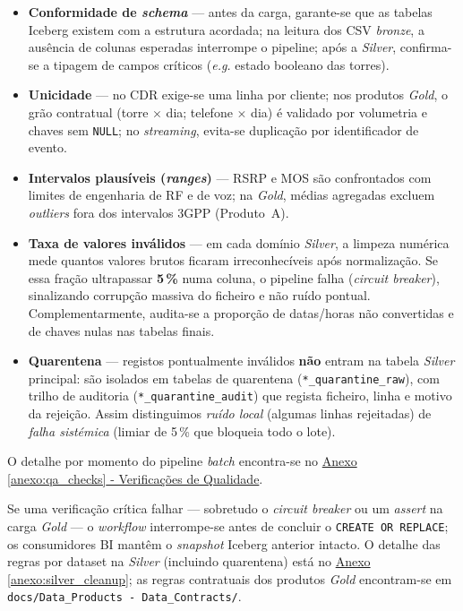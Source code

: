 \documentclass[runningheads]{llncs}
\begin{document}
\begin{itemize}
    \item \textbf{Conformidade de \textit{schema}} --- antes da carga, garante-se que as tabelas Iceberg existem com a estrutura acordada; na leitura dos CSV \textit{bronze}, a ausência de colunas esperadas interrompe o pipeline; após a \textit{Silver}, confirma-se a tipagem de campos críticos (\textit{e.g.} estado booleano das torres).
    \item \textbf{Unicidade} --- no CDR exige-se uma linha por cliente; nos produtos \textit{Gold}, o grão contratual (torre $\times$ dia; telefone $\times$ dia) é validado por volumetria e chaves sem \texttt{NULL}; no \textit{streaming}, evita-se duplicação por identificador de evento.
    \item \textbf{Intervalos plausíveis (\textit{ranges})} --- RSRP e MOS são confrontados com limites de engenharia de RF e de voz; na \textit{Gold}, médias agregadas excluem \textit{outliers} fora dos intervalos 3GPP (Produto~A).
    \item \textbf{Taxa de valores inválidos} --- em cada domínio \textit{Silver}, a limpeza numérica mede quantos valores brutos ficaram irreconhecíveis após normalização. Se essa fração ultrapassar \textbf{5\,\%} numa coluna, o pipeline falha (\textit{circuit breaker}), sinalizando corrupção massiva do ficheiro e não ruído pontual. Complementarmente, audita-se a proporção de datas/horas não convertidas e de chaves nulas nas tabelas finais.
    \item \textbf{Quarentena} --- registos pontualmente inválidos \textbf{não} entram na tabela \textit{Silver} principal: são isolados em tabelas de quarentena (\texttt{*\_quarantine\_raw}), com trilho de auditoria (\texttt{*\_quarantine\_audit}) que regista ficheiro, linha e motivo da rejeição. Assim distinguimos \emph{ruído local} (algumas linhas rejeitadas) de \emph{falha sistémica} (limiar de 5\,\% que bloqueia todo o lote).
\end{itemize}

O detalhe por momento do pipeline \textit{batch} encontra-se no \hyperref[anexo:qa_checks]{Anexo \ref*{anexo:qa_checks} - Verificações de Qualidade}.

Se uma verificação crítica falhar --- sobretudo o \textit{circuit breaker} ou um \textit{assert} na carga \textit{Gold} --- o \textit{workflow} interrompe-se antes de concluir o \texttt{CREATE OR REPLACE}; os consumidores BI mantêm o \textit{snapshot} Iceberg anterior intacto. O detalhe das regras por dataset na \textit{Silver} (incluindo quarentena) está no \hyperref[anexo:silver_cleanup]{Anexo \ref*{anexo:silver_cleanup}}; as regras contratuais dos produtos \textit{Gold} encontram-se em \texttt{docs/Data\_Products - Data\_Contracts/}.
\end{document}
